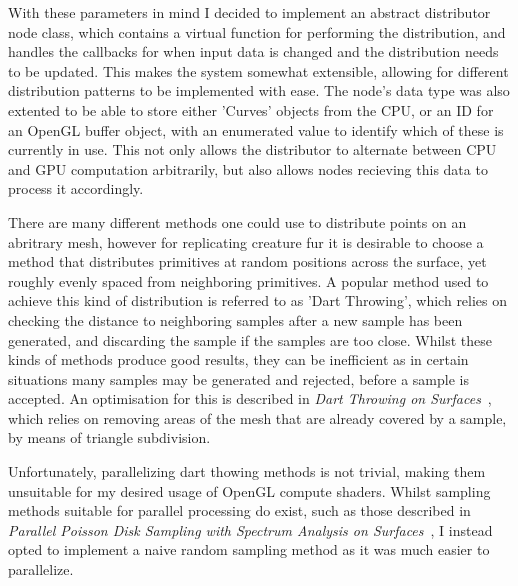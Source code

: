 \documentclass[]{acmsiggraph}
\begin{document}
With these parameters in mind I decided to implement an abstract distributor node class, which contains a virtual function for performing the distribution, and handles the callbacks for when input data is changed and the distribution needs to be updated. This makes the system somewhat extensible, allowing for different distribution patterns to be implemented with ease. The node's data type was also extented to be able to store either 'Curves' objects from the CPU, or an ID for an OpenGL buffer object, with an enumerated value to identify which of these is currently in use. This not only allows the distributor to alternate between CPU and GPU computation arbitrarily, but also allows nodes recieving this data to process it accordingly.

There are many different methods one could use to distribute points on an abritrary mesh, however for replicating creature fur it is desirable to choose a method that distributes primitives at random positions across the surface, yet roughly evenly spaced from neighboring primitives. A popular method used to achieve this kind of distribution is referred to as 'Dart Throwing', which relies on checking the distance to neighboring samples after a new sample has been generated, and discarding the sample if the samples are too close. Whilst these kinds of methods produce good results, they can be inefficient as in certain situations many samples may be generated and rejected, before a sample is accepted. An optimisation for this is described in \textit{Dart Throwing on Surfaces}~\cite{dartThrowing}, which relies on removing areas of the mesh that are already covered by a sample, by means of triangle subdivision.

Unfortunately, parallelizing dart thowing methods is not trivial, making them unsuitable for my desired usage of OpenGL compute shaders. Whilst sampling methods suitable for parallel processing do exist, such as those described in \textit{Parallel Poisson Disk Sampling with Spectrum Analysis on Surfaces}~\cite{parallelPoisson}, I instead opted to implement a naive random sampling method as it was much easier to parallelize.


\end{document}
